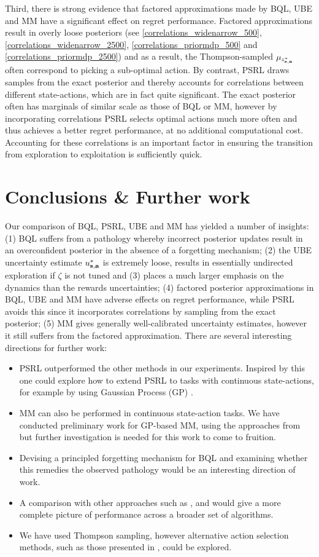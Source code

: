 \documentclass{article}
\begin{document}
Third, there is strong evidence that factored approximations made by BQL, UBE and MM have a significant effect on regret performance. Factored approximations result in overly loose posteriors (see \cref{correlations_widenarrow_500}, \cref{correlations_widenarrow_2500}, \cref{correlations_priormdp_500} and \cref{correlations_priormdp_2500}) and as a result, the Thompson-sampled $\mu_{z^*_{\mathbf{s}, \mathbf{a}}}$ often correspond to picking a sub-optimal action. By contrast, PSRL draws samples from the exact posterior and thereby accounts for correlations between different state-actions, which are in fact quite significant. The exact posterior often has marginals of similar scale as those of BQL or MM, however by incorporating correlations PSRL selects optimal actions much more often and thus achieves a better regret performance, at no additional computational cost. Accounting for these correlations is an important factor in ensuring the transition from exploration to exploitation is sufficiently quick.

\section{Conclusions \& Further work}

Our comparison of BQL, PSRL, UBE and MM has yielded a number of insights: (1) BQL suffers from a pathology whereby incorrect posterior updates result in an overconfident posterior in the absence of a forgetting mechanism; (2) the UBE uncertainty estimate $u^*_{\mathbf{s}, \mathbf{a}}$ is extremely loose, results in essentially undirected exploration if $\zeta$ is not tuned and (3) places a much larger emphasis on the dynamics than the rewards uncertainties; (4) factored posterior approximations in BQL, UBE and MM have adverse effects on regret performance, while PSRL avoids this since it incorporates correlations by sampling from the exact posterior; (5) MM gives generally well-calibrated uncertainty estimates, however it still suffers from the factored approximation. There are several interesting directions for further work:
\begin{itemize}
\item PSRL outperformed the other methods in our experiments. Inspired by this one could explore how to extend PSRL to tasks with continuous state-actions, for example by using Gaussian Process (GP) \citep{gps_textbook}.
\item MM can also be performed in continuous state-action tasks. We have conducted preliminary work for GP-based MM, using the approaches from \cite{gpsinrl, quintechrep} but further investigation is needed for this work to come to fruition.
\item Devising a principled forgetting mechanism for BQL and examining whether this remedies the observed pathology would be an interesting direction of work.
\item A comparison with other approaches such as \cite{bdqn}, \cite{su} and \cite{rlvi} would give a more complete picture of performance across a broader set of algorithms.
\item We have used Thompson sampling, however alternative action selection methods, such as those presented in \cite{bqlearning}, could be explored.
\end{itemize}
\end{document}
